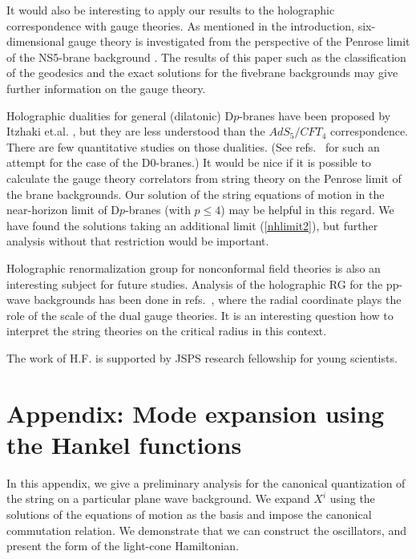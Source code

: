 \documentclass[a4paper,12pt]{article}
\begin{document}
It would also be interesting to  apply our results to the 
holographic correspondence with gauge theories. 
As mentioned in the introduction,
six-dimensional gauge theory is investigated from
the perspective of the Penrose limit of the NS5-brane 
background \cite{HuRaVe,OzSa}. The results of this paper
such as the classification of  the geodesics and the exact 
solutions for the fivebrane backgrounds
may give further information on the gauge theory.

Holographic dualities for general (dilatonic) 
D$p$-branes have been proposed by  
Itzhaki et.al. \cite{IzMaSoYa},
but they are less understood than the $AdS_5/CFT_4$ 
correspondence. There are few
quantitative studies on those dualities.
(See refs.~\cite{SeYo, Se} for such
an attempt for the case of the D0-branes.)
It would be nice if it is possible to 
calculate the gauge theory correlators from string 
theory on the Penrose limit of
the brane backgrounds.
Our solution of the string equations of motion
in the near-horizon limit of D$p$-branes (with
$p\le4$) may be helpful in this regard. 
We have found the solutions
taking an additional limit (\ref{nhlimit2}), but
further analysis without that restriction would
be important. 

Holographic renormalization group for nonconformal field 
theories is also an interesting subject for future studies.
Analysis of the holographic RG for the pp-wave backgrounds 
has been done in refs.~\cite{CoHaKeWa, GiPaSo, BrJoLoMy},
where the radial coordinate plays the role of the scale of 
the dual gauge theories. It is an interesting question
how to interpret the string theories on the critical
radius in this context.



\vspace{1cm}



The work of H.F. is supported 
by JSPS research fellowship for young scientists.


\section*{Appendix: Mode expansion using the Hankel functions}
\renewcommand{\theequation}{A.\arabic{equation}}
\setcounter{equation}{0}
In this appendix, we give a preliminary analysis for the canonical
quantization of the string on a particular plane wave background.
We expand $X^{i}$ using the solutions of the equations
of motion as the basis and impose the canonical 
commutation relation.
We demonstrate that we can construct the oscillators,
and present the form of the light-cone Hamiltonian.
\end{document}
